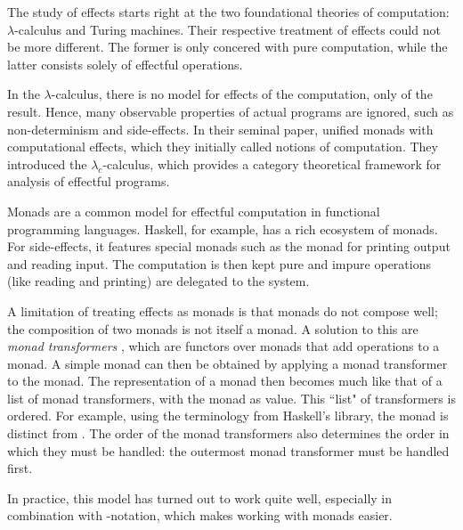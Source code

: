The study of effects starts right at the two foundational theories of computation: $\lambda$-calculus and Turing machines. Their respective treatment of effects could not be more different. The former is only concered with pure computation, while the latter consists solely of effectful operations.

In the $\lambda$-calculus, there is no model for effects of the computation, only of the result. \autocite{moggi_computational_1989} Hence, many observable properties of actual programs are ignored, such as non-determinism and side-effects. In their seminal paper, \textcite{moggi_computational_1989} unified monads with computational effects, which they initially called notions of computation. They introduced the $\lambda_c$-calculus, which provides a category theoretical framework for analysis of effectful programs.


Monads are a common model for effectful computation in functional programming languages. Haskell, for example, has a rich ecosystem of monads. For side-effects, it features special monads such as the  monad for printing output and reading input. The computation is then kept pure and impure operations (like reading and printing) are delegated to the system.

A limitation of treating effects as monads is that monads do not compose well; the composition of two monads is not itself a monad. A solution to this are \emph{monad transformers} \autocite{moggi_abstract_1989}, which are functors over monads that add operations to a monad. A simple monad can then be obtained by applying a monad transformer to the  monad. The representation of a monad then becomes much like that of a list of monad transformers, with the  monad as  value. This ``list" of transformers is ordered. For example, using the terminology from Haskell's  library, the monad  is distinct from . The order of the monad transformers also determines the order in which they must be handled: the outermost monad transformer must be handled first.

In practice, this model has turned out to work quite well, especially in combination with -notation, which makes working with monads easier.

